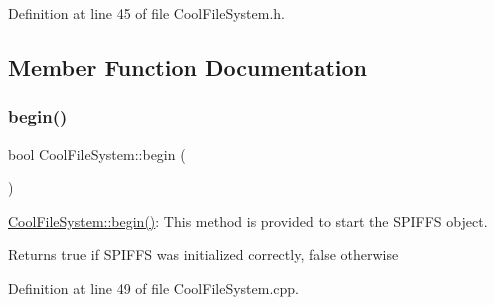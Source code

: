 Definition at line 45 of file Cool\+File\+System.\+h.



\subsection{Member Function Documentation}
\mbox{\label{class_cool_file_system_a6ba6f666ed4c530174f8569d2c636748}} 
\subsubsection{\texorpdfstring{begin()}{begin()}}
{\footnotesize\ttfamily bool Cool\+File\+System\+::begin (\begin{DoxyParamCaption}{ }\end{DoxyParamCaption})}

\hyperlink{class_cool_file_system_a6ba6f666ed4c530174f8569d2c636748}{Cool\+File\+System\+::begin()}\+: This method is provided to start the S\+P\+I\+F\+FS object.

\begin{DoxyReturn}{Returns}
true if S\+P\+I\+F\+FS was initialized correctly, false otherwise 
\end{DoxyReturn}


Definition at line 49 of file Cool\+File\+System.\+cpp.


